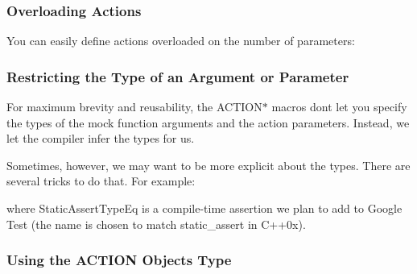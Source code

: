 \subsubsection*{Overloading Actions}

You can easily define actions overloaded on the number of parameters\+: 
\begin{DoxyCode}{0}
\end{DoxyCode}


\subsubsection*{Restricting the Type of an Argument or Parameter}

For maximum brevity and reusability, the {\ttfamily A\+C\+T\+I\+O\+N$\ast$} macros don\textquotesingle{}t let you specify the types of the mock function arguments and the action parameters. Instead, we let the compiler infer the types for us.

Sometimes, however, we may want to be more explicit about the types. There are several tricks to do that. For example\+: 
\begin{DoxyCode}{0}
\DoxyCodeLine{\}}
\DoxyCodeLine{}
\DoxyCodeLine{}
\DoxyCodeLine{\}}
\end{DoxyCode}
 where {\ttfamily Static\+Assert\+Type\+Eq} is a compile-\/time assertion we plan to add to Google Test (the name is chosen to match {\ttfamily static\+\_\+assert} in C++0x).

\subsubsection*{Using the A\+C\+T\+I\+ON Object\textquotesingle{}s Type}

